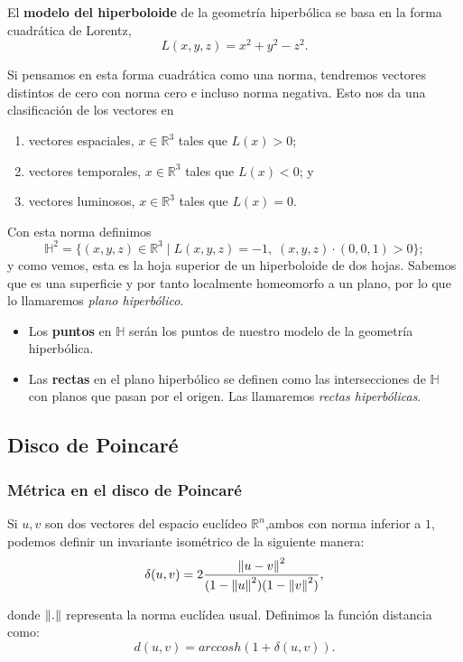 \documentclass{article}
\theoremstyle{plain}
\theoremstyle{definition}
\theoremstyle{remark}
\newcommand{\norm}[1]{\ensuremath\left\Vert #1 \right\Vert}
\begin{document}
El \textbf{modelo del hiperboloide} de la geometría hiperbólica se
basa en la forma cuadrática de Lorentz,
\[L(x,y,z)=x^2+y^2-z^2.\]

Si pensamos en esta forma cuadrática como una norma, tendremos vectores
distintos de cero con norma cero e incluso norma negativa. Esto nos da
una clasificación de los vectores en

\begin{enumerate}
\item vectores espaciales, $x\in\mathbb{R}^3$ tales que $L(x)>0$;
\item vectores temporales, $x\in\mathbb{R}^3$ tales que $L(x)<0$; y
\item vectores luminosos, $x\in\mathbb{R}^3$ tales que $L(x)=0$.
\end{enumerate}

Con esta norma definimos
\[\mathbb{H}^2=\{(x,y,z)\in\mathbb{R}^3 \mid L(x,y,z)=-1,\; (x,y,z) \cdot (0,0,1) > 0 \};\]
y como vemos, esta es la hoja superior de un hiperboloide de dos
hojas. Sabemos que es una superficie y por tanto localmente
homeomorfo a un plano, por lo que lo llamaremos \textit{plano hiperbólico}.

\begin{itemize}
\item Los \textbf{puntos} en $\mathbb{H}$ serán los puntos de nuestro modelo
  de la geometría hiperbólica.
\item Las \textbf{rectas} en el plano hiperbólico se definen como las intersecciones
  de $\mathbb{H}$ con planos que pasan por el origen. Las llamaremos
  \textit{rectas hiperbólicas}.
\end{itemize}



\subsection{Disco de Poincaré}

\subsubsection{Métrica en el disco de Poincaré}
Si $u,v$ son dos vectores del espacio euclídeo $\mathbb{R}^n$,ambos
con norma inferior a $1$, podemos definir un invariante isométrico de
la siguiente manera:
\[\delta (u,v)=2\frac{\norm{u-v}^2}{(1-\norm{u}^2)(1-\norm{v}^2)},\]

donde $\norm{.}$ representa la norma euclídea usual. Definimos la
función distancia como:
\[d(u,v)=arccosh(1+\delta(u,v)).\]
\end{document}
